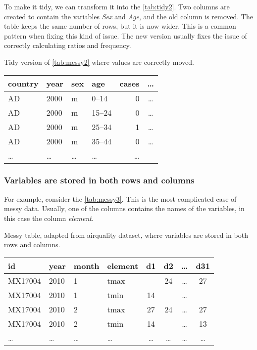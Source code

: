 To make it tidy, we can transform it into the \cref{tab:tidy2}.  Two columns are created
to contain the variables \emph{Sex} and \emph{Age}, and the old column is removed.  The
table keeps the same number of rows, but it is now wider.  This is a common pattern when
fixing this kind of issue.  The new version usually fixes the issue of correctly
calculating ratios and frequency.

\begin{tablebox}[label=tab:tidy2]{Tidy version of \cref{tab:messy2} where values are correctly moved.}
  \centering
  \begin{tabular}{l l l l r c}
    \toprule
    country & year & sex & age & cases & \dots \\
    \midrule
    AD & 2000 & m & 0--14 & 0 & \dots \\
    AD & 2000 & m & 15--24 & 0 & \dots \\
    AD & 2000 & m & 25--34 & 1 & \dots \\
    AD & 2000 & m & 35--44 & 0 & \dots \\
    \dots & \dots & \dots & \dots & \dots \\
    \bottomrule
  \end{tabular}
\end{tablebox}

\clearpage
\subsubsection{Variables are stored in both rows and columns}  For example, consider the
\cref{tab:messy3}.  This is the most complicated case of messy data.  Usually, one of the
columns contains the names of the variables, in this case the column \emph{element}.

\begin{tablebox}[label=tab:messy3]{Messy table, adapted from airquality dataset, where variables are stored in both rows and columns.}
  \centering
  \begin{tabular}{llllcccc}
    \toprule
    id & year & month & element & d1 & d2 & \dots & d31 \\
    \midrule
    MX17004 & 2010 & 1 & tmax &    & 24 & \dots & 27 \\
    MX17004 & 2010 & 1 & tmin & 14 &    & \dots &    \\
    MX17004 & 2010 & 2 & tmax & 27 & 24 & \dots & 27 \\
    MX17004 & 2010 & 2 & tmin & 14 &    & \dots & 13 \\
    \dots & \dots & \dots & \dots & \dots & \dots & \dots & \dots \\
    \bottomrule
  \end{tabular}
\end{tablebox}

